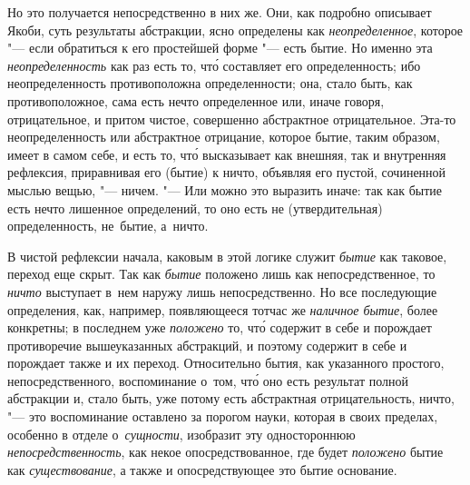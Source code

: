 Но это получается непосредственно в них же. Они, как подробно описывает Якоби,
суть результаты абстракции, ясно определены как {\em неопределенное}, которое
"--- если обратиться к его простейшей форме "--- есть бытие. Но именно эта
{\em неопределенность} как раз есть то, чт\'{о} составляет его определенность;
ибо неопределенность противоположна определенности; она, стало быть, как
противоположное, сама есть нечто определенное или, иначе говоря, отрицательное,
и притом чистое, совершенно абстрактное отрицательное. Эта-то неопределенность
или абстрактное отрицание, которое бытие, таким образом, имеет в самом себе, и
есть то, чт\'{о} высказывает как внешняя, так и внутренняя рефлексия,
приравнивая его (бытие) к ничто, объявляя его пустой, сочиненной мыслью вещью,
"--- ничем. "--- Или можно это выразить иначе: так как бытие есть нечто
лишенное определений, то оно есть не (утвердительная) определенность, не~бытие,
а~ничто.

В чистой рефлексии начала, каковым в этой логике служит {\em бытие} как
таковое, переход еще скрыт. Так как {\em бытие} положено лишь как
непосредственное, то {\em ничто} выступает в~нем наружу лишь непосредственно.
Но все последующие определения, как, например, появляющееся тотчас же
{\em наличное бытие}, более конкретны; в последнем уже {\em положено} то,
чт\'{о} содержит в себе и порождает противоречие вышеуказанных абстракций, и
поэтому содержит в себе и порождает также и их переход. Относительно бытия, как
указанного простого, непосредственного, воспоминание о~том, чт\'{о} оно есть
результат полной абстракции и, стало быть, уже потому есть абстрактная
отрицательность, ничто, "--- это воспоминание оставлено за порогом науки,
которая в своих пределах, особенно в отделе о~{\em сущности}, изобразит эту
одностороннюю {\em непосредственность}, как некое опосредствованное, где будет
{\em положено} бытие как {\em существование}, а также и опосредствующее это
бытие основание.

